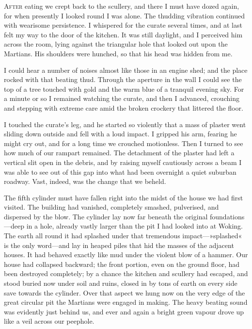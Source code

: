 

\lettrine[lines=4]{A}{fter} eating we crept back to the scullery, and there I must have dozed again, for when presently I looked round I was alone. The thudding vibration continued with wearisome persistence. I whispered for the curate several times, and at last felt my way to the door of the kitchen. It was still daylight, and I perceived him across the room, lying against the triangular hole that looked out upon the Martians. His shoulders were hunched, so that his head was hidden from me.

I could hear a number of noises almost like those in an engine shed; and the place rocked with that beating thud. Through the aperture in the wall I could see the top of a tree touched with gold and the warm blue of a tranquil evening sky. For a minute or so I remained watching the curate, and then I advanced, crouching and stepping with extreme care amid the broken crockery that littered the floor.

I touched the curate's leg, and he started so violently that a mass of plaster went sliding down outside and fell with a loud impact. I gripped his arm, fearing he might cry out, and for a long time we crouched motionless. Then I turned to see how much of our rampart remained. The detachment of the plaster had left a vertical slit open in the debris, and by raising myself cautiously across a beam I was able to see out of this gap into what had been overnight a quiet suburban roadway. Vast, indeed, was the change that we beheld.

The fifth cylinder must have fallen right into the midst of the house we had first visited. The building had vanished, completely smashed, pulverised, and dispersed by the blow. The cylinder lay now far beneath the original foundations—deep in a hole, already vastly larger than the pit I had looked into at Woking. The earth all round it had splashed under that tremendous impact—»splashed« is the only word—and lay in heaped piles that hid the masses of the adjacent houses. It had behaved exactly like mud under the violent blow of a hammer. Our house had collapsed backward; the front portion, even on the ground floor, had been destroyed completely; by a chance the kitchen and scullery had escaped, and stood buried now under soil and ruins, closed in by tons of earth on every side save towards the cylinder. Over that aspect we hung now on the very edge of the great circular pit the Martians were engaged in making. The heavy beating sound was evidently just behind us, and ever and again a bright green vapour drove up like a veil across our peephole.

